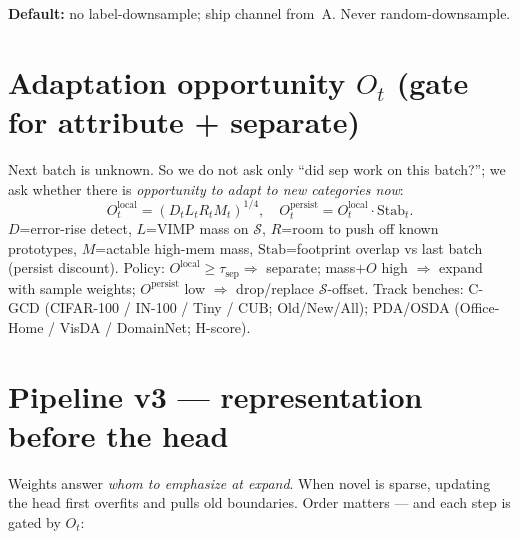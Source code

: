 \documentclass[11pt]{article}
\begin{document}
\noindent\textbf{Default:} no label-downsample; ship channel from~A.
Never random-downsample.

\section{Adaptation opportunity $O_t$
(gate for attribute + separate)}

Next batch is unknown. So we do not ask only ``did sep work on this
batch?''; we ask whether there is \emph{opportunity to adapt to new
categories now}:
\[
O^{\mathrm{local}}_t=(D_t L_t R_t M_t)^{1/4},\quad
O^{\mathrm{persist}}_t=O^{\mathrm{local}}_t\cdot\mathrm{Stab}_t.
\]
$D$=error-rise detect, $L$=VIMP mass on $\mathcal{S}$,
$R$=room to push off known prototypes, $M$=actable high-mem mass,
$\mathrm{Stab}$=footprint overlap vs last batch (persist discount).
Policy: $O^{\mathrm{local}}\ge\tau_{\mathrm{sep}}\Rightarrow$ separate;
mass$+O$ high $\Rightarrow$ expand with sample weights;
$O^{\mathrm{persist}}$ low $\Rightarrow$ drop/replace $\mathcal{S}$-offset.
Track benches: C-GCD (CIFAR-100 / IN-100 / Tiny / CUB; Old/New/All);
PDA/OSDA (Office-Home / VisDA / DomainNet; H-score).

\section{Pipeline v3 --- representation before the head}

Weights answer \emph{whom to emphasize at expand}.
When novel is sparse, updating the head first overfits and pulls old
boundaries. Order matters --- and each step is gated by $O_t$:
\end{document}
